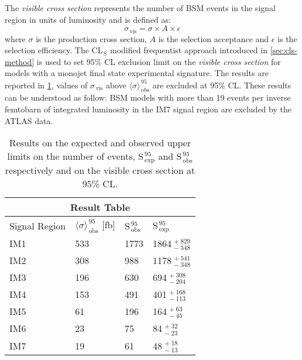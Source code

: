 The \emph{visible cross section} represents the number of BSM events in the
signal region in units of luminosity and is defined as:
\begin{equation}
  \label{eq:113}
  \sigma_\mathrm{\, vis} = \sigma \times A \times \epsilon
\end{equation}
where $\sigma$ is the production cross section, $A$ is the selection acceptance
and $\epsilon$ is the selection efficiency. The CL$_\mathrm{\, S}$ modified
frequentist approach introduced in \cref{sec:cls-method} is used to
set 95\% CL exclusion limit on the \emph{visible cross section} for models with
a monojet final state experimental signature. The results are reported in
\cref{tab:cs_vis_results}, values of $\sigma_\mathrm{\, vis}$ above
$\langle \sigma \rangle_\mathrm{\, obs}^{\, 95}$ are excluded at 95\%
CL\@. These results can be understood as follow: BSM models with more than 19
events per inverse femtobarn of integrated luminosity in the IM7 signal region
are excluded by the ATLAS data.
\begin{table}[!h]
  \centering
  \begin{tabular}{llll}
    \toprule
    \multicolumn{4}{c}{Result Table} \\
    \midrule \midrule
    Signal Region & $\langle \sigma \rangle_\mathrm{\, obs}^{\, 95}$ [fb] & S$_\mathrm{\, obs}^{\, 95}$ & S$_\mathrm{\, exp}^{\, 95}$ \\
    \midrule
    IM1 & 533 & 1773 & 1864$_{\, -548}^{\, +829}$ \\
    IM2 & 308 & 988 & 1178$_{\, -348}^{\, +541}$ \\
    IM3 & 196 & 630 & 694$_{\, -204}^{\, +308}$ \\
    IM4 & 153 & 491 & 401$_{\, -113}^{\, +168}$ \\
    IM5 & 61 & 196 & 164$_{\, -45}^{\, +63}$ \\
    IM6 & 23 & 75 & 84$_{\, -23}^{\, +32}$ \\
    IM7 & 19 & 61 & 48$_{\, -13}^{\, +18}$ \\
    \bottomrule
  \end{tabular}
  \caption{Results on the expected and observed upper limits on the number of
    events, S$_\mathrm{\, exp}^{\, 95}$ and S$_\mathrm{\, obs}^{\, 95}$
    respectively and on the visible cross section at 95\% CL.}
  \label{tab:cs_vis_results}
\end{table}
